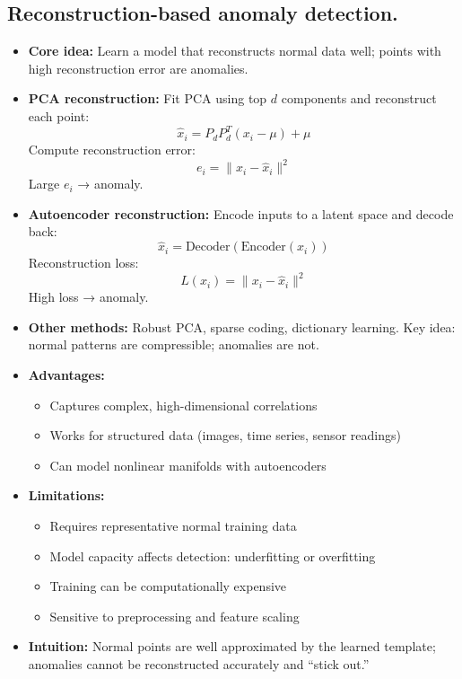 \documentclass{article}
\begin{document}
\subsection*{Reconstruction-based anomaly detection.}

\begin{itemize}
    \item \textbf{Core idea:} Learn a model that reconstructs normal data well; points with high reconstruction error are anomalies.

    \item \textbf{PCA reconstruction:}  
    Fit PCA using top $d$ components and reconstruct each point:
    \[
    \hat{x}_i = P_d P_d^T (x_i - \mu) + \mu
    \]
    Compute reconstruction error:
    \[
    e_i = \|x_i - \hat{x}_i\|^2
    \]
    Large $e_i$ → anomaly.

    \item \textbf{Autoencoder reconstruction:}  
    Encode inputs to a latent space and decode back:
    \[
    \hat{x}_i = \text{Decoder}(\text{Encoder}(x_i))
    \]
    Reconstruction loss:
    \[
    L(x_i) = \|x_i - \hat{x}_i\|^2
    \]
    High loss → anomaly.

    \item \textbf{Other methods:}  
    Robust PCA, sparse coding, dictionary learning. Key idea: normal patterns are compressible; anomalies are not.

    \item \textbf{Advantages:}
    \begin{itemize}
        \item Captures complex, high-dimensional correlations
        \item Works for structured data (images, time series, sensor readings)
        \item Can model nonlinear manifolds with autoencoders
    \end{itemize}

    \item \textbf{Limitations:}
    \begin{itemize}
        \item Requires representative normal training data
        \item Model capacity affects detection: underfitting or overfitting
        \item Training can be computationally expensive
        \item Sensitive to preprocessing and feature scaling
    \end{itemize}

    \item \textbf{Intuition:}  
    Normal points are well approximated by the learned template; anomalies cannot be reconstructed accurately and “stick out.”
\end{itemize}
\end{document}

